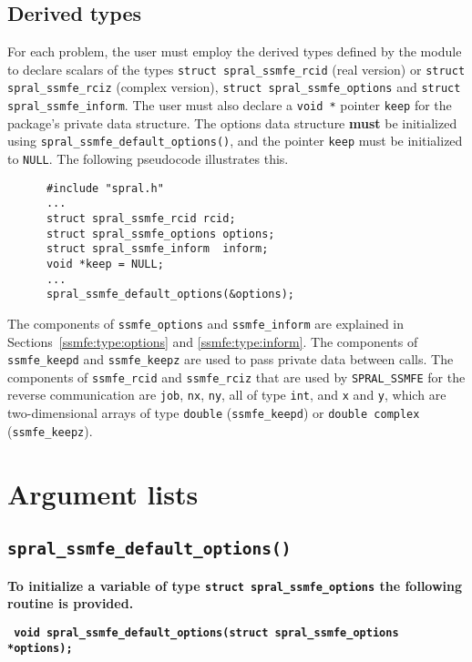 \subsection{Derived types}
For each problem, the user must employ the derived types defined by the
module to declare scalars of the types 
{\tt struct spral\_ssmfe\_rcid} (real version) or 
{\tt struct spral\_ssmfe\_rciz} (complex version), 
{\tt struct spral\_ssmfe\_options} and 
{\tt struct spral\_ssmfe\_inform}. The user must also declare a \texttt{void *}
pointer \texttt{keep} for the package's private data structure. The options
data structure \textbf{must} be initialized using
\texttt{spral\_ssmfe\_default\_options()}, and the pointer \texttt{keep} must
be initialized to \texttt{NULL}.
The following pseudocode illustrates this.
\begin{verbatim}
      #include "spral.h"
      ...
      struct spral_ssmfe_rcid rcid;
      struct spral_ssmfe_options options;
      struct spral_ssmfe_inform  inform;
      void *keep = NULL;
      ...
      spral_ssmfe_default_options(&options);
\end{verbatim}

The components of 
{\tt ssmfe\_options} and 
{\tt ssmfe\_inform} are explained
in Sections~\ref{ssmfe:type:options} and \ref{ssmfe:type:inform}. 
The components of {\tt ssmfe\_keepd} and {\tt ssmfe\_keepz} 
are used to pass 
private data between calls. 
The components of
{\tt ssmfe\_rcid} and 
{\tt ssmfe\_rciz} 
that are used by \texttt{SPRAL\_SSMFE}
for the reverse communication are
{\tt job},
{\tt nx},
{\tt ny}, all of type \texttt{int},
and
{\tt x} and {\tt y},
which are 
two-dimensional arrays
of type \texttt{double} (\texttt{ssmfe\_keepd}) or \texttt{double complex} (\texttt{ssmfe\_keepz}).


\section{Argument lists}

\subsection{\texttt{spral\_ssmfe\_default\_options()}}

\textbf{To initialize a variable of type \texttt{struct spral\_ssmfe\_options}
the following routine is provided.}

\medskip
\noindent
\textbf{\texttt{
      \hspace*{0.3cm} void spral\_ssmfe\_default\_options(struct spral\_ssmfe\_options *options);
}}

